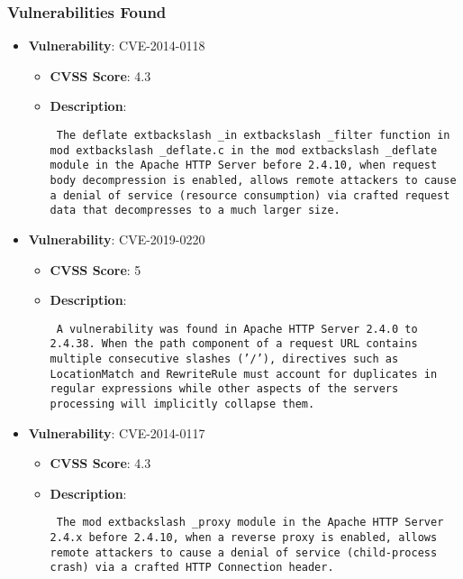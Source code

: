 \documentclass{article}
\begin{document}
\subsubsection*{Vulnerabilities Found}

\begin{itemize}
    
        \item \textbf{Vulnerability}: CVE-2014-0118
        \begin{itemize}
            \item \textbf{CVSS Score}:  4.3 
            \item \textbf{Description}: \parbox{\linewidth}{\texttt{ The deflate	extbackslash _in	extbackslash _filter function in mod	extbackslash _deflate.c in the mod	extbackslash _deflate module in the Apache HTTP Server before 2.4.10, when request body decompression is enabled, allows remote attackers to cause a denial of service (resource consumption) via crafted request data that decompresses to a much larger size. }}
        \end{itemize}
    
        \item \textbf{Vulnerability}: CVE-2019-0220
        \begin{itemize}
            \item \textbf{CVSS Score}:  5 
            \item \textbf{Description}: \parbox{\linewidth}{\texttt{ A vulnerability was found in Apache HTTP Server 2.4.0 to 2.4.38. When the path component of a request URL contains multiple consecutive slashes ('/'), directives such as LocationMatch and RewriteRule must account for duplicates in regular expressions while other aspects of the servers processing will implicitly collapse them. }}
        \end{itemize}
    
        \item \textbf{Vulnerability}: CVE-2014-0117
        \begin{itemize}
            \item \textbf{CVSS Score}:  4.3 
            \item \textbf{Description}: \parbox{\linewidth}{\texttt{ The mod	extbackslash _proxy module in the Apache HTTP Server 2.4.x before 2.4.10, when a reverse proxy is enabled, allows remote attackers to cause a denial of service (child-process crash) via a crafted HTTP Connection header. }}
        \end{itemize}
    

\end{itemize}
\end{document}
